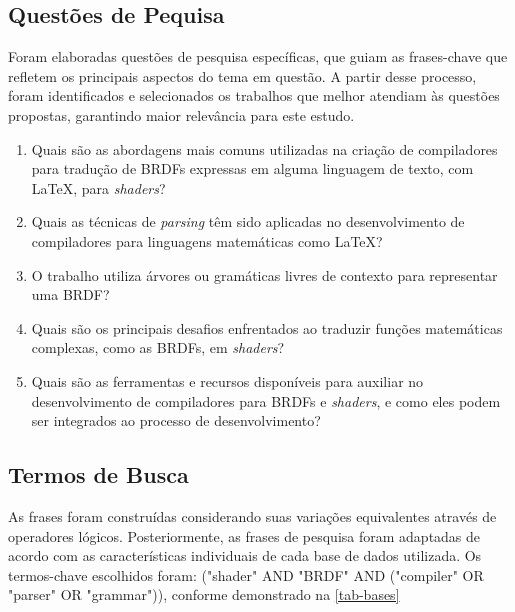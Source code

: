 \documentclass[english, 
               brazil, 
               bsc] %
               {dcomp-abntex2}
\begin{document}
% 
%


%








\subsection{Questões de Pequisa}  \label{questoes-pesquisa}


Foram elaboradas questões de pesquisa específicas, que guiam as frases-chave que refletem os principais aspectos do tema em questão. A partir desse processo, foram identificados e selecionados os trabalhos que melhor atendiam às questões propostas, garantindo maior relevância para este estudo.


\begin{enumerate}
  \item Quais são as abordagens mais comuns utilizadas na criação de compiladores para tradução de BRDFs expressas em alguma linguagem de texto, com \LaTeX , para \textit{shaders}?


  \item Quais as técnicas de \textit{parsing} têm sido aplicadas no desenvolvimento de compiladores para linguagens matemáticas como \LaTeX ?


  \item O trabalho utiliza árvores ou gramáticas livres de contexto para representar uma BRDF?


 \item Quais são os principais desafios enfrentados ao traduzir funções matemáticas complexas, como as BRDFs, em \textit{shaders}?


 \item Quais são as ferramentas e recursos disponíveis para auxiliar no desenvolvimento de compiladores para BRDFs e \textit{shaders}, e como eles podem ser integrados ao processo de desenvolvimento?


\end{enumerate}






\subsection{Termos de Busca}
 As frases foram construídas considerando suas variações equivalentes através de operadores lógicos. Posteriormente, as frases de pesquisa foram adaptadas de acordo com as características individuais de cada base de dados utilizada. Os termos-chave escolhidos foram: ("shader" AND "BRDF" AND ("compiler" OR "parser" OR "grammar")), conforme demonstrado na \autoref{tab-bases}
\end{document}
